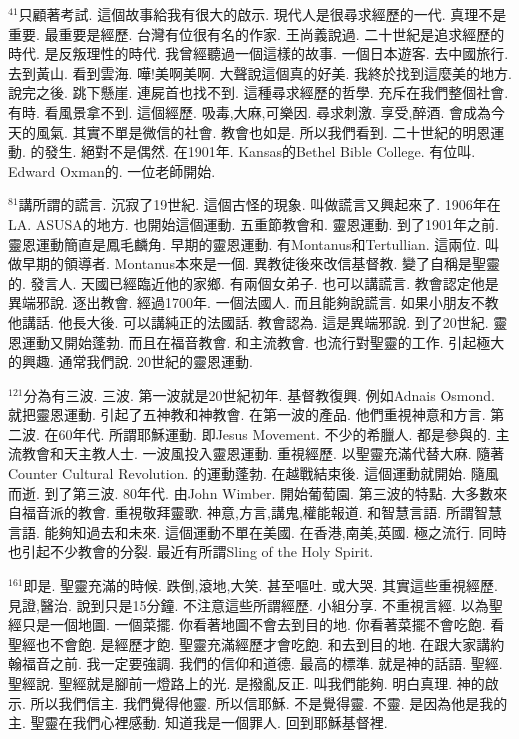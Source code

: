 \documentclass{book}
\begin{document}
$^{41}$只顧著考試.
這個故事給我有很大的啟示.
現代人是很尋求經歷的一代.
真理不是重要.
最重要是經歷.
台灣有位很有名的作家.
王尚義說過.
二十世紀是追求經歷的時代.
是反叛理性的時代.
我曾經聽過一個這樣的故事.
一個日本遊客.
去中國旅行.
去到黃山.
看到雲海.
嘩!美啊美啊.
大聲說這個真的好美.
我終於找到這麼美的地方.
說完之後.
跳下懸崖.
連屍首也找不到.
這種尋求經歷的哲學.
充斥在我們整個社會.
有時.
看風景拿不到.
這個經歷.
吸毒,大麻,可樂因.
尋求刺激.
享受,醉酒.
會成為今天的風氣.
其實不單是微信的社會.
教會也如是.
所以我們看到.
二十世紀的明恩運動.
的發生.
絕對不是偶然.
在1901年.
Kansas的Bethel Bible College.
有位叫.
Edward Oxman的.
一位老師開始.

$^{81}$講所謂的謊言.
沉寂了19世紀.
這個古怪的現象.
叫做謊言又興起來了.
1906年在LA.
ASUSA的地方.
也開始這個運動.
五重節教會和.
靈恩運動.
到了1901年之前.
靈恩運動簡直是鳳毛麟角.
早期的靈恩運動.
有Montanus和Tertullian.
這兩位.
叫做早期的領導者.
Montanus本來是一個.
異教徒後來改信基督教.
變了自稱是聖靈的.
發言人.
天國已經臨近他的家鄉.
有兩個女弟子.
也可以講謊言.
教會認定他是異端邪說.
逐出教會.
經過1700年.
一個法國人.
而且能夠說謊言.
如果小朋友不教他講話.
他長大後.
可以講純正的法國話.
教會認為.
這是異端邪說.
到了20世紀.
靈恩運動又開始蓬勃.
而且在福音教會.
和主流教會.
也流行對聖靈的工作.
引起極大的興趣.
通常我們說.
20世紀的靈恩運動.

$^{121}$分為有三波.
三波.
第一波就是20世紀初年.
基督教復興.
例如Adnais Osmond.
就把靈恩運動.
引起了五神教和神教會.
在第一波的產品.
他們重視神意和方言.
第二波.
在60年代.
所謂耶穌運動.
即Jesus Movement.
不少的希臘人.
都是參與的.
主流教會和天主教人士.
一波風投入靈恩運動.
重視經歷.
以聖靈充滿代替大麻.
隨著Counter Cultural Revolution.
的運動蓬勃.
在越戰結束後.
這個運動就開始.
隨風而逝.
到了第三波.
80年代.
由John Wimber.
開始葡萄園.
第三波的特點.
大多數來自福音派的教會.
重視敬拜靈歌.
神意,方言,講鬼,權能報道.
和智慧言語.
所謂智慧言語.
能夠知過去和未來.
這個運動不單在美國.
在香港,南美,英國.
極之流行.
同時也引起不少教會的分裂.
最近有所謂Sling of the Holy Spirit.

$^{161}$即是.
聖靈充滿的時候.
跌倒,滾地,大笑.
甚至嘔吐.
或大哭.
其實這些重視經歷.
見證,醫治.
說到只是15分鐘.
不注意這些所謂經歷.
小組分享.
不重視言經.
以為聖經只是一個地圖.
一個菜擺.
你看著地圖不會去到目的地.
你看著菜擺不會吃飽.
看聖經也不會飽.
是經歷才飽.
聖靈充滿經歷才會吃飽.
和去到目的地.
在跟大家講約翰福音之前.
我一定要強調.
我們的信仰和道德.
最高的標準.
就是神的話語.
聖經.
聖經說.
聖經就是腳前一燈路上的光.
是撥亂反正.
叫我們能夠.
明白真理.
神的啟示.
所以我們信主.
我們覺得他靈.
所以信耶穌.
不是覺得靈.
不靈.
是因為他是我的主.
聖靈在我們心裡感動.
知道我是一個罪人.
回到耶穌基督裡.
\end{document}
